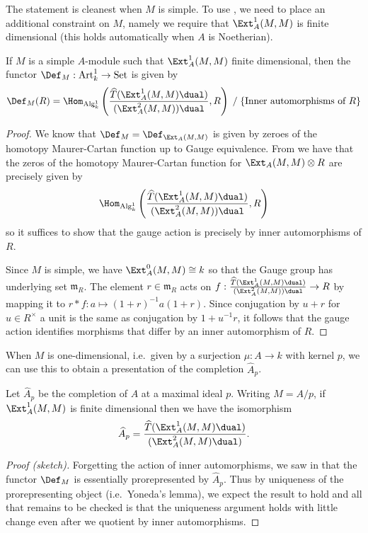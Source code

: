 The statement is cleanest when \(M\) is simple. To use
, we need to place an additional constraint on
\(M\), namely we require that \(\Ext^1_A(M,M)\) is finite dimensional (this
holds automatically when \(A\) is Noetherian).

\begin{theorem}[Segal]\label{thm-segal}
    If \(M\) is a simple \(A\)-module such that \(\Ext^1_A(M,M)\) finite
    dimensional, then the functor \(\Def_M: \textnormal{Art}^1_k \rightarrow
    \text{Set}\) is given by 
    \[
        \Def_M(R) = \Hom_{\textnormal{Alg}^1_k}
        \left(\frac{\widehat{T}(\Ext^1_A(M,M)\dual)}{(\Ext_A^2(M,M))\dual},
        R\right)\;/\;\{\text{Inner automorphisms of \(R\)}\} 
    \]
    \begin{proof}
        We know that \(\Def_M=\Def_{\Ext_A(M,M)}\) is given by zeroes of the
        homotopy Maurer-Cartan function up to Gauge equivalence. From
         we have that the zeros of the homotopy
        Maurer-Cartan function for \(\Ext_A(M,M)\otimes R\) are precisely given
        by 
        \[ 
            \Hom_{\text{Alg}^1_k} \left(
            \frac{\widehat{T}(\Ext^1_A(M,M)\dual)}{(\Ext_A^2(M,M))\dual}, R\right) 
        \]
        so it suffices to show that the gauge action is precisely by inner
        automorphisms of \(R\). 

        Since \(M\) is simple, we have \(\Ext^0_A(M,M)\cong k\) so that the
        Gauge group has underlying set \(\mathfrak{m}_R\). The element \(r\in
        \mathfrak{m}_R\) acts on
        \(f:\frac{\widehat{T}(\Ext^1_A(M,M)\dual)}{(\Ext_A^2(M,M))\dual}\rightarrow
        R\) by mapping it to \(r\ast f: a\mapsto (1+r)^{-1}a(1+r)\). Since
        conjugation by \(u+r\) for \(u\in R^\times\) a unit is the same as
        conjugation by \(1+u^{-1}r\), it follows that the gauge action
        identifies morphisms that differ by an inner automorphism of \(R\).
    \end{proof}
\end{theorem}

When \(M\) is one-dimensional, i.e.\ given by a surjection \(\mu:A\rightarrow
k\) with kernel \(p\), we can use this to obtain a presentation of the
completion \(\widehat{A}_p\).

\begin{corollary}
    Let \(\widehat{A}_p\) be the completion of \(A\) at a maximal ideal \(p\).
    Writing \(M=A/p\), if \(\Ext^1_A(M,M)\) is finite dimensional then we have
    the isomorphism 
    \[\widehat{A}_p =
    \frac{\widehat{T}(\Ext^1_A(M,M)\dual)}{(\Ext_A^2(M,M)\dual)}.\]
    \begin{proof}[Proof (sketch)] 
        Forgetting the action of inner automorphisms, we saw in
         that the functor
        \(\Def_M\) is essentially prorepresented by \(\widehat{A}_p\). Thus by
        uniqueness of the prorepresenting object (i.e.\ Yoneda's lemma), we
        expect the result to hold and all that remains to be checked is that the
        uniqueness argument holds with little change even after we quotient by
        inner automorphisms.
    \end{proof}
\end{corollary}

